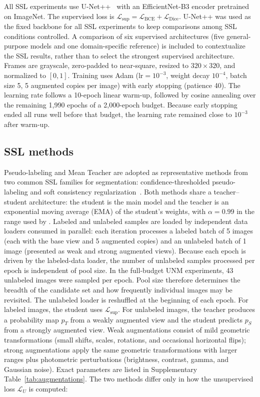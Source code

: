 \documentclass[a4paper,fleqn]{cas-dc}
\begin{document}
All SSL experiments use U-Net++~\citep{ref_unetpp} with an EfficientNet-B3 encoder pretrained on ImageNet.
The supervised loss is $\mathcal{L}_{\text{sup}} = \mathcal{L}_{\text{BCE}} + \mathcal{L}_{\text{Dice}}$.
U-Net++ was used as the fixed backbone for all SSL experiments to keep comparisons among SSL conditions controlled. A comparison of six supervised architectures (five general-purpose models and one domain-specific reference) is included to contextualize the SSL results, rather than to select the strongest supervised architecture.
Frames are grayscale, zero-padded to near-square, resized to $320{\times}320$, and normalized to $[0,1]$.
Training uses Adam ($\text{lr}{=}10^{-3}$, weight decay $10^{-4}$, batch size 5, 5 augmented copies per image) with early stopping (patience 40).
The learning rate follows a 10-epoch linear warm-up, followed by cosine annealing over the remaining 1{,}990 epochs of a 2{,}000-epoch budget. Because early stopping ended all runs well before that budget, the learning rate remained close to $10^{-3}$ after warm-up.

\subsection{SSL methods}
\label{subsec:ssl}

Pseudo-labeling and Mean Teacher are adopted as representative methods from two common SSL families for segmentation: confidence-thresholded pseudo-labeling and soft consistency regularization~\citep{ref_ssl_survey,ref_xiao2022}.
Both methods share a teacher--student architecture: the student is the main model and the teacher is an exponential moving average (EMA) of the student's weights, with $\alpha{=}0.99$ in the range used by \citet{ref_mean_teacher}.
Labeled and unlabeled samples are loaded by independent data loaders consumed in parallel: each iteration processes a labeled batch of 5 images (each with the base view and 5 augmented copies) and an unlabeled batch of 1 image (presented as weak and strong augmented views).
Because each epoch is driven by the labeled-data loader, the number of unlabeled samples processed per epoch is independent of pool size. In the full-budget UNM experiments, 43 unlabeled images were sampled per epoch. Pool size therefore determines the breadth of the candidate set and how frequently individual images may be revisited. The unlabeled loader is reshuffled at the beginning of each epoch.
For labeled images, the student uses $\mathcal{L}_{\text{sup}}$.
For unlabeled images, the teacher produces a probability map $p_T$ from a weakly augmented view and the student predicts $p_S$ from a strongly augmented view.
Weak augmentations consist of mild geometric transformations (small shifts, scales, rotations, and occasional horizontal flips); strong augmentations apply the same geometric transformations with larger ranges plus photometric perturbations (brightness, contrast, gamma, and Gaussian noise). Exact parameters are listed in Supplementary Table~\ref{tab:augmentations}.
The two methods differ only in how the unsupervised loss $\mathcal{L}_U$ is computed:
\end{document}
